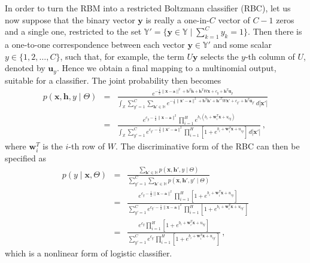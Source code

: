 \documentclass[a4paper]{article}
\renewcommand{\v}[1]{\mathbf{#1}}
\begin{document}
In order to turn the RBM into a restricted Boltzmann classifier (RBC), let us now suppose that the binary vector $\v{y}$
is really a one-in-$C$ vector of $C-1$ zeros and a single one, restricted to the set
$\mathbb{Y}'=\{\v{y}\in\mathbb{Y}\;|\;\sum_{k=1}^{C}y_k=1\}$. Then there is a one-to-one correspondence between each
vector $\v{y}\in\mathbb{Y}'$ and some scalar $y\in\{1,2,\ldots,C\}$, such that, for example,
the term $U\v{y}$ selects the $y$-th column of $U$, denoted by $\v{u}_y$.
Hence we obtain a final mapping to a multinomial output, suitable for a classifier.
The joint probability then becomes
\begin{eqnarray}
     p(\v{x},\v{h},y\;|\;\Theta) &=&
\frac{
    e^{-\frac{1}{2}\|\v{x}-\v{a}\|^2+\v{b}^T\v{h}+\v{h}^T W\v{x}+c_y+\v{h}^T \v{u}_y}
}
{\int_{\mathbb{X}}\sum_{y'=1}^{C}\sum_{\v{h}'\in\mathbb{H}}
   e^{-\frac{1}{2}\|\v{x}'-\v{a}\|^2+\v{b}^T\v{h}'+\v{h}'^T W\v{x}'+c_{y'}+\v{h}^T \v{u}_{y'}}
   \,d|\v{x}'|
}
\nonumber\\&=&
\frac{
    e^{c_y-\frac{1}{2}\|\v{x}-\v{a}\|^2}
\prod_{i=1}^{H}e^{h_i(b_i+ \v{w}_i^T\v{x}+u_{iy})}
}
{\int_{\mathbb{X}}\sum_{y'=1}^{C}
   e^{c_{y'}-\frac{1}{2}\|\v{x}'-\v{a}\|^2}
  \prod_{i=1}^{H}\left[1+e^{b_i+ \v{w}_i^T\v{x}+u_{iy}}\right]
  \,d|\v{x}'|
}
\,,
\end{eqnarray}
where $\v{w}_i^T$ is the $i$-th row of $W$.
The discriminative form of the RBC can then be specified as
\begin{eqnarray}
    p(y\;|\;\v{x},\Theta) & = & 
\frac{\sum_{\v{h}'\in\mathbb{H}}p(\v{x},\v{h}',y\;|\;\Theta)}
{\sum_{y'=1}^{C}\sum_{\v{h}'\in\mathbb{H}}p(\v{x},\v{h}',y'\;|\;\Theta)}
\nonumber\\&=&
\frac{
    e^{c_y-\frac{1}{2}\|\v{x}-\v{a}\|^2}\prod_{i=1}^{H}\left[1+e^{b_i+ \v{w}_i^T\v{x}+u_{iy}}\right]
}
{\sum_{y'=1}^{C}
   e^{c_{y'}-\frac{1}{2}\|\v{x}-\v{a}\|^2}\prod_{i=1}^{H}\left[1+e^{b_i+ \v{w}_i^T\v{x}+u_{iy'}}\right]
}
\nonumber\\&=&
\frac{
   e^{c_y}\prod_{i=1}^{H}\left[1+e^{b_i+ \v{w}_i^T\v{x}+u_{iy}}\right]
}
{
\sum_{y'=1}^{C} 
e^{c_{y'}}\prod_{i=1}^{H}\left[1+e^{b_i+ \v{w}_i^T\v{x}+u_{iy'}}\right]
}
\,,
\label{eq:p_y_x}
\end{eqnarray}
which is a nonlinear form of logistic classifier.
\end{document}
